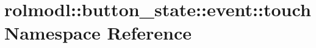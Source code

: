 \hypertarget{namespacerolmodl_1_1button__state_1_1event_1_1touch}{}\section{rolmodl\+::button\+\_\+state\+::event\+::touch Namespace Reference}
\label{namespacerolmodl_1_1button__state_1_1event_1_1touch}
